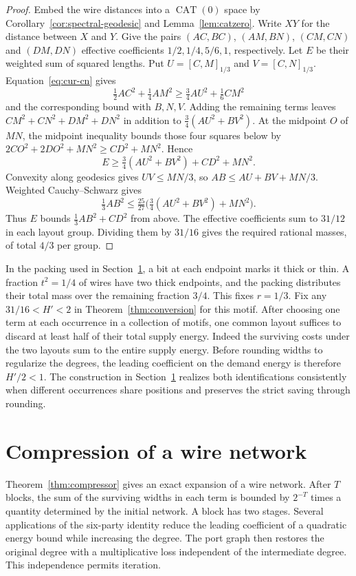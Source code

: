 \begin{proof}
Embed the wire distances into a $\operatorname{CAT}(0)$ space by Corollary~\ref{cor:spectral-geodesic} and Lemma~\ref{lem:catzero}. Write $XY$ for the distance between $X$ and $Y$. Give the pairs $(AC,BC)$, $(AM,BN)$, $(CM,CN)$ and $(DM,DN)$ effective coefficients $1/2,1/4,5/6,1$, respectively. Let $E$ be their weighted sum of squared lengths. Put $U=[C,M]_{1/3}$ and $V=[C,N]_{1/3}$. Equation~\eqref{eq:cur-cn} gives
\[
  \tfrac12 AC^2+\tfrac14 AM^2\ge\tfrac34 AU^2+\tfrac16 CM^2
\]
and the corresponding bound with $B,N,V$. Adding the remaining terms leaves $CM^2+CN^2+DM^2+DN^2$ in addition to $\tfrac34(AU^2+BV^2)$. At the midpoint $O$ of $MN$, the midpoint inequality bounds those four squares below by $2CO^2+2DO^2+MN^2\ge CD^2+MN^2$. Hence
\[
 E\ge\tfrac34(AU^2+BV^2)+CD^2+MN^2 .
\]
Convexity along geodesics gives $UV\le MN/3$, so $AB\le AU+BV+MN/3$. Weighted Cauchy--Schwarz gives
\[
 \tfrac13 AB^2\le\tfrac{25}{27}\bigl(\tfrac34(AU^2+BV^2)+MN^2\bigr).
\]
Thus $E$ bounds $\tfrac13 AB^2+CD^2$ from above. The effective coefficients sum to $31/12$ in each layout group. Dividing them by $31/16$ gives the required rational masses, of total $4/3$ per group.
\end{proof}

In the packing used in Section~\ref{sec:compressor}, a bit at each
endpoint marks it thick or thin. A fraction
$t^2=1/4$ of wires have two thick endpoints, and the packing distributes
their total mass over the remaining fraction $3/4$. This fixes $r=1/3$.
Fix any $31/16<H'<2$ in Theorem~\ref{thm:conversion} for this motif.
After choosing one term at each occurrence in a collection of motifs,
one common layout suffices to discard at least half of their total
supply energy. Indeed the surviving costs under the two layouts sum to
the entire supply energy. Before rounding widths to regularize the
degrees, the leading coefficient on the demand energy is therefore
$H'/2<1$. The construction in Section~\ref{sec:compressor} realizes both identifications consistently
when different occurrences share positions and preserves the strict
saving through rounding.
\section{Compression of a wire network}\label{sec:compressor}

Theorem~\ref{thm:compressor} gives an exact expansion of a wire network.
After $T$ blocks, the sum of the surviving widths in each term is
bounded by $2^{-T}$ times a quantity determined by the initial network.
A block has two stages. Several applications of the six-party identity
reduce the leading coefficient of a quadratic energy bound while
increasing the degree. The port graph then restores the original degree
with a multiplicative loss independent of the intermediate degree.
This independence permits iteration.

